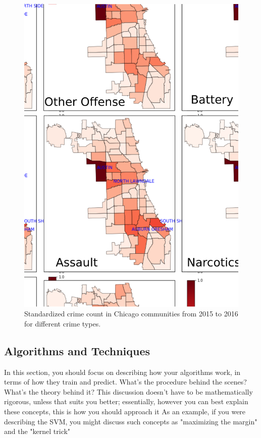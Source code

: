 \documentclass[12pt]{article}
\begin{document}
\begin{figure}[ht]
\includegraphics[scale=0.35]{figure/community.eps}
\centering
\caption{Standardized crime count in Chicago communities from 2015 to 2016 for different crime types.}
\label{fig:community}
\end{figure}

\subsection{Algorithms and Techniques}


In this section, you should focus on describing how your algorithms work, in terms of how they train and predict. What's the procedure behind the scenes? What's the theory behind it? This discussion doesn't have to be mathematically rigorous, unless that suits you better; essentially, however you can best explain these concepts, this is how you should approach it
As an example, if you were describing the SVM, you might discuss such concepts as "maximizing the margin" and the "kernel trick"
\end{document}
